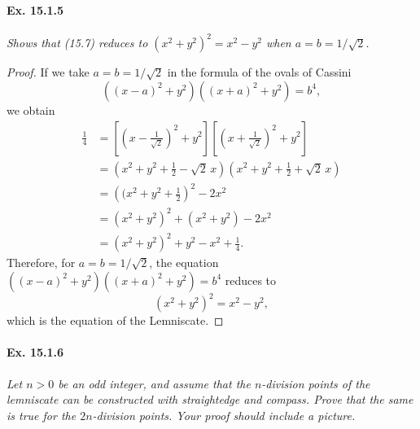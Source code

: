 \documentclass[11pt,a4paper]{article}
\begin{document}
\paragraph{Ex. 15.1.5}{\it  Shows that (15.7) reduces to $(x^2+y^2)^2 = x^2 -y^2$ when $a=b = 1/\sqrt{2}$.
}
\begin{proof}
 If we take $a=b=1/\sqrt{2}$ in the formula of the ovals of Cassini
 $$((x-a)^2 + y^2)((x+a)^2 + y^2) = b^4,$$
 we obtain
 \begin{align*}
 \frac{1}{4} &= \left[ \left(x - \frac{1}{\sqrt{2}} \right)^2 + y^2\right ] \left[ \left(x + \frac{1}{\sqrt{2}} \right)^2 + y^2\right ]  \\
 &=\left( x^2+y^2 +\frac{1}{2}  - \sqrt{2}\, x \right)\left( x^2+y^2 +\frac{1}{2}  + \sqrt{2}\, x \right)\\
 &=\left((x^2 + y^2 + \frac{1}{2}\right)^2 - 2 x^2\\
 &=(x^2+y^2)^2  + (x^2+y^2) - 2 x^2\\
 &= (x^2+y^2)^2 + y^2 -x^2 + \frac{1}{4}.
 \end{align*}
 Therefore, for $a=b =1/\sqrt{2}$, the equation $((x-a)^2 + y^2)((x+a)^2 + y^2) = b^4$ reduces to
 $$(x^2 + y^2)^2 = x^2 - y^2,$$
 which is the equation of the Lemniscate.
\end{proof}


\paragraph{Ex. 15.1.6}{\it Let $n>0$ be an odd integer, and assume that the $n$-division points of the lemniscate can be constructed with straightedge and compass. Prove that the same is true for the $2n$-division points. Your proof should include a picture.
}
\end{document}
